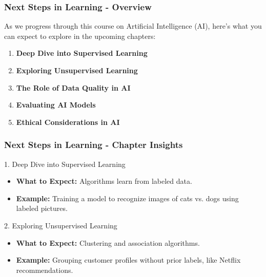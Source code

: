 \documentclass[aspectratio=169]{beamer}
\begin{document}
\begin{frame}[fragile]
    \frametitle{Next Steps in Learning - Overview}
    As we progress through this course on Artificial Intelligence (AI), here’s what you can expect to explore in the upcoming chapters:
    \begin{enumerate}
        \item \textbf{Deep Dive into Supervised Learning}
        \item \textbf{Exploring Unsupervised Learning}
        \item \textbf{The Role of Data Quality in AI}
        \item \textbf{Evaluating AI Models}
        \item \textbf{Ethical Considerations in AI}
    \end{enumerate}
\end{frame}

\begin{frame}[fragile]
    \frametitle{Next Steps in Learning - Chapter Insights}
    \begin{block}{1. Deep Dive into Supervised Learning}
        \begin{itemize}
            \item \textbf{What to Expect:} Algorithms learn from labeled data.
            \item \textbf{Example:} Training a model to recognize images of cats vs. dogs using labeled pictures.
        \end{itemize}
    \end{block}
    
    \begin{block}{2. Exploring Unsupervised Learning}
        \begin{itemize}
            \item \textbf{What to Expect:} Clustering and association algorithms.
            \item \textbf{Example:} Grouping customer profiles without prior labels, like Netflix recommendations.
        \end{itemize}
    \end{block}
\end{frame}
\end{document}
